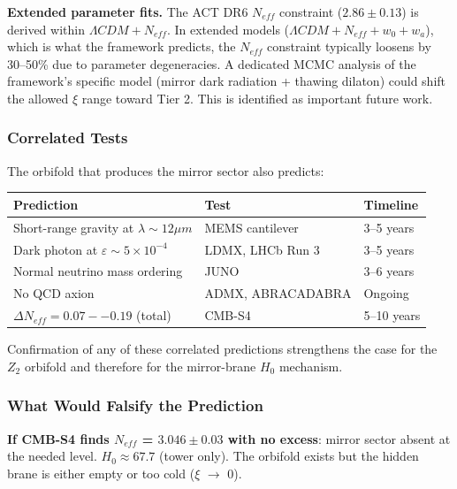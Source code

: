 \documentclass[aps,prd,preprint,superscriptaddress,longbibliography,floatfix]{revtex4-2}
\theoremstyle{remark}
\begin{document}
\textbf{Extended parameter fits.} The ACT DR6 $N_{eff}$ constraint ($2.86 \pm 0.13$) is derived within $\Lambda CDM + N_{eff}$. In extended models ($\Lambda CDM + N_{eff} + w_{0} + w_a$), which is what the framework predicts, the $N_{eff}$ constraint typically loosens by 30--50\% due to parameter degeneracies. A dedicated MCMC analysis of the framework's specific model (mirror dark radiation + thawing dilaton) could shift the allowed $\xi$ range toward Tier 2. This is identified as important future work.


\subsubsection{Correlated Tests}

The orbifold that produces the mirror sector also predicts:


\begin{table}[H]
\begin{ruledtabular}
\begin{tabular}{p{5.0cm}p{5.0cm}p{5.0cm}}
Prediction & Test & Timeline \\
\hline
Short-range gravity at $\lambda \sim  12 \mu m$ & MEMS cantilever & 3--5 years \\
Dark photon at $\varepsilon \sim  5 \times 10^{-4}$ & LDMX, LHCb Run 3 & 3--5 years \\
Normal neutrino mass ordering & JUNO & 3--6 years \\
No QCD axion & ADMX, ABRACADABRA & Ongoing \\
$\Delta N_{eff} = 0.07--0.19$ (total) & CMB-S4 & 5--10 years \\
\end{tabular}
\end{ruledtabular}
\end{table}

Confirmation of any of these correlated predictions strengthens the case for the $Z_{2}$ orbifold and therefore for the mirror-brane $H_{0}$ mechanism.


\subsubsection{What Would Falsify the Prediction}

\textbf{If CMB-S4 finds $N_{eff}$ = $3.046 \pm 0.03$ with no excess}: mirror sector absent at the needed level. $H_{0} \approx 67.7$ (tower only). The orbifold exists but the hidden brane is either empty or too cold ($\xi$ $\to$ 0).
\end{document}
